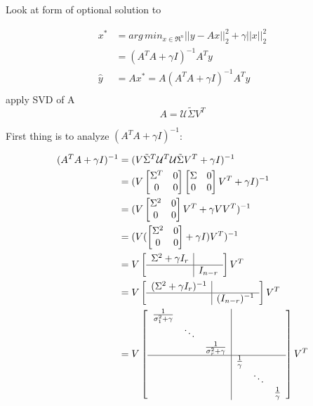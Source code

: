 Look at form of optional solution to 

\begin{align*}
x^* &= arg\,min_{x\in \Re^n}||y-Ax||_2^2 + \gamma||x||^2_2\\
&= (A^TA + \gamma I)^{-1}A^Ty\\
\hat{y}&= Ax^* = A(A^TA + \gamma I)^{-1}A^Ty\\
\end{align*}
apply SVD of A
\begin{equation*}
A = \mathcal{U}\tilde{\Sigma}V^T
\end{equation*}

First thing is to analyze $(A^TA + \gamma I)^{-1}$:

\begin{align*}
(A^TA + \gamma I)^{-1} &= (V\tilde{\Sigma}^T\mathcal{U}^T\mathcal{U}\tilde{\Sigma}V^T + \gamma I)^{-1}\\
&= (V
\begin{bmatrix}
\Sigma^T & 0\\
0 & 0\\
\end{bmatrix}
\begin{bmatrix}
\Sigma & 0\\
0 & 0\\
\end{bmatrix}
V^T + \gamma I)^{-1}\\
&=(V
\begin{bmatrix}
\Sigma^2 & 0\\
0  & 0
\end{bmatrix}
V^T + \gamma VV^T
)^{-1}\\
&= (V(
\begin{bmatrix}
\Sigma^2 & 0\\
0 & 0
\end{bmatrix}
+\gamma I)V^T)^{-1}\\
&= V
\left[
\begin{array}{c|c}
\Sigma^2+\gamma I_r&  \\ \hline 
& I_{n-r}
\end{array}
\right]
V^T\\
&=
V
\left[
\begin{array}{c|c}
(\Sigma^2+\gamma I_r)^{-1}&  \\ \hline 
& (I_{n-r})^{-1}
\end{array}
\right]
V^T\\
&=
V
\left[
\begin{array}{c|c}
\begin{matrix}
\frac{1}{\sigma_1^2+\gamma} & &\\
&\ddots&\\
&&\frac{1}{\sigma_r^2+\gamma}
\end{matrix}&  \\ \hline 
& \begin{matrix}
\frac{1}{\gamma} & &\\
&\ddots&\\
&&\frac{1}{\gamma}
\end{matrix}
\end{array}
\right]
V^T
\end{align*}

